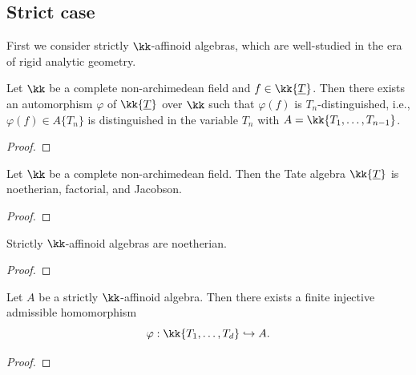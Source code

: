 \subsection{Strict case}

    First we consider strictly \(\kk\)-affinoid algebras, which are well-studied in the era of rigid analytic geometry.

    \begin{proposition}\label{prop:automorphism_of_T_n_over_k}
        Let \(\kk\) be a complete non-archimedean field and \(f \in \kk\{\underline{T}\}\).
        Then there exists an automorphism \(\varphi\) of \(\kk\{\underline{T}\}\) over \(\kk\) such that \(\varphi(f)\) is \(T_n\)-distinguished, 
        i.e., \(\varphi(f) \in A\{T_n\}\) is distinguished in the variable \(T_n\) with \(A = \kk\{T_1, \ldots, T_{n-1}\}\).
    \end{proposition}
    \begin{proof}
    \end{proof}

    \begin{proposition}\label{prop:strictly_Tate_algebra_is_noetherian_factorial_and_Jacobson}
        Let \(\kk\) be a complete non-archimedean field.
        Then the Tate algebra \(\kk\{\underline{T}\}\) is noetherian, factorial, and Jacobson.
    \end{proposition}
    \begin{proof}
    \end{proof}

    \begin{corollary}\label{prop:affinoid_algebra_is_noetherian}
        Strictly \(\kk\)-affinoid algebras are noetherian.
    \end{corollary}
    \begin{proof}
    \end{proof}
    
    \begin{theorem}\label{thm:noetherian_normalization_theorem}
        Let \(A\) be a strictly \(\kk\)-affinoid algebra.
        Then there exists a finite injective admissible homomorphism
        \[
            \varphi: \kk\{ T_1, \ldots, T_d \} \hookrightarrow A.
        \]
    \end{theorem}
    \begin{proof}
    \end{proof}

